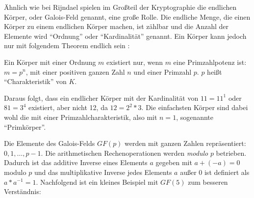  Ähnlich wie bei Rijndael spielen im Großteil der Kryptographie die endlichen Körper, oder Galois-Feld genannt,
 eine große Rolle. Die endliche Menge, die einen Körper zu einem endlichen Körper machen, ist zählbar und
 die Anzahl der Elemente wird ``Ordnung'' oder ``Kardinalität'' genannt. Ein Körper kann jedoch nur
 mit folgendem Theorem endlich sein \cite{paar10}:
 
 \begin{center}
  \parbox{12cm}{\centering
   Ein Körper mit einer Ordnung $m$ existiert nur, wenn $m$ eine Primzahlpotenz ist:
   $m = p^n$, mit einer positiven ganzen Zahl $n$ und einer Primzahl $p$. $p$ heißt ``Charakteristik''
   von $K$.
  }
 \end{center} 
 
 Daraus folgt, dass ein endlicher Körper mit der Kardinalität von $11 = 11^1$ oder $81 = 3^4$ existiert, aber
 nicht 12, da $12 = 2^2 * 3$. Die einfachsten Körper sind dabei wohl die mit einer Primzahlcharakteristik, also
 mit $n = 1$, sogenannte ``Primkörper''.
 
 Die Elemente des Galois-Felds $GF(p)$ werden mit ganzen Zahlen repräsentiert: $0, 1, \dots, p-1$. Die arithmetischen
 Rechenoperationen werden \emph{modulo} $p$ betrieben. Dadurch ist das additive Inverse eines Elements $a$ gegeben
 mit $a + (-a) = 0$ modulo $p$ und das multiplikative Inverse jedes Elements $a$ außer 0 ist definiert als $a * a^{-1} = 1$.
 Nachfolgend ist ein kleines Beispiel mit $GF(5)$ zum besseren Verständnis:
 
